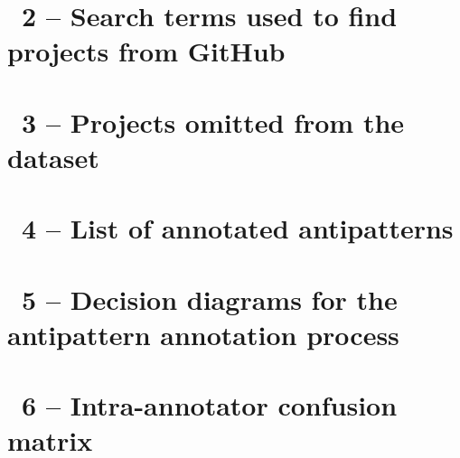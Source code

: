 \clearpage
{}
\makeatletter
\def\@currentlabel{2}
\makeatother
{}\label{chapter:appendix-github-search-terms}
\chapter*{\appendixTitle~2 -- Search terms used to find projects from GitHub}


\clearpage
{}
\makeatletter
\def\@currentlabel{3}
\makeatother
{}\label{chapter:appendix-omitted-projects}
\chapter*{\appendixTitle~3 -- Projects omitted from the dataset}


\clearpage
{}
\makeatletter
\def\@currentlabel{4}
\makeatother
{}\label{chapter:appendix-annotated-antipatterns}
\chapter*{\appendixTitle~4 -- List of annotated antipatterns}


\clearpage
{}
\makeatletter
\def\@currentlabel{5}
\makeatother
{}\label{chapter:appendix-annotation-process-diagrams}
\chapter*{\appendixTitle~5 -- Decision diagrams for the antipattern annotation process}


\clearpage
{}
\makeatletter
\def\@currentlabel{6}
\makeatother
{}\label{chapter:appendix-annotation-confusion-matrix}
\chapter*{\appendixTitle~6 -- Intra-annotator confusion matrix}


